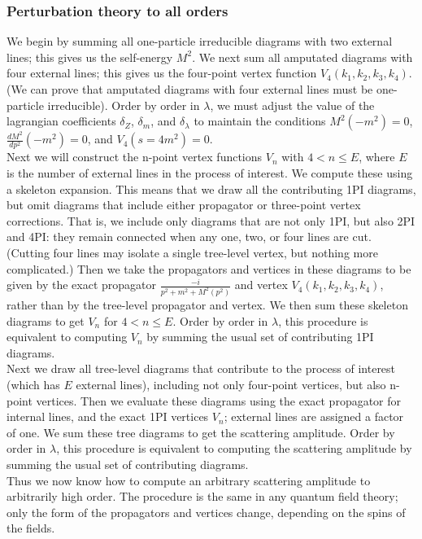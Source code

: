 \subsubsection{Perturbation theory to all orders}
We begin by summing all one-particle irreducible diagrams with two external lines; this gives us the self-energy $M^2$. We next sum all amputated diagrams with four external lines; this gives us the four-point vertex function $V_4(k_1, k_2, k_3, k_4)$. (We can prove that amputated diagrams with four external lines must be one-particle irreducible). Order by order in $\lambda$, we must adjust the value of the lagrangian coefficients $\delta_Z$, $\delta_m$, and $\delta_{\lambda}$ to maintain the conditions $M^2(-m^2) = 0$, $\frac{dM^2}{dp^2}(-m^2) = 0$, and $V_4(s=4m^2) =0$. 
\\
Next we will construct the n-point vertex functions $V_n$ with $4 < n \leq E$, where $E$ is the number of external lines in the process of interest. We compute these using a skeleton expansion. This means that we draw all the contributing 1PI diagrams, but omit diagrams that include either propagator or three-point vertex corrections. That is, we include only diagrams that are not only 1PI, but also 2PI and 4PI: they remain connected when any one, two, or four lines are cut. (Cutting four lines may isolate a single tree-level vertex, but nothing more complicated.) Then we take the propagators and vertices in these diagrams to be given by the exact propagator $\frac{-i}{p^2+m^2+M^2(p^2)}$ and vertex $V_4(k_1,k_2,k_3,k_4)$, rather than by the tree-level propagator and vertex. We then sum these skeleton diagrams to get $V_n$ for $4 < n \leq E$. Order by order in $\lambda$, this procedure is
equivalent to computing $V_n$ by summing the usual set of contributing 1PI diagrams.
\\
Next we draw all tree-level diagrams that contribute to the process of interest (which has $E$ external lines), including not only four-point vertices, but also n-point vertices. Then we evaluate these diagrams using the exact propagator for internal lines, and the exact 1PI vertices $V_n$; external lines are assigned a factor of one. We sum these tree diagrams to get the scattering amplitude. Order by order in $\lambda$, this procedure is equivalent to computing the scattering amplitude by summing the usual set of contributing diagrams.
\\
Thus we now know how to compute an arbitrary scattering amplitude
to arbitrarily high order. The procedure is the same in any quantum field theory; only the form of the propagators and vertices change, depending on the spins of the fields.

